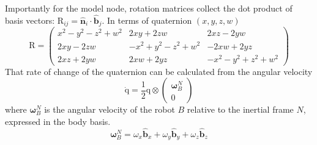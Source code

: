 \documentclass[lettersize,journal]{IEEEtran}
\begin{document}
Importantly for the model node, rotation matrices collect the dot product of basis vectors: $\mathrm{R}_{ij} = \mathbf{\hat{n}}_i \cdot \mathbf{\hat{b}}_j$. In terms of quaternion $(x, y, z, w)$
\begin{equation}
  \mathrm{R}=\left(
  \begin{smallmatrix}
    x^2-y^2-z^2+w^2 & 2xy+2zw & 2xz-2yw \\
    2xy-2zw & -x^2+y^2-z^2+w^2 & -2xw+2yz \\
    2xz+2yw & 2xw+2yz & -x^2-y^2+z^2+w^2
  \end{smallmatrix} 
  \right) \label{EQN:RotationMatrix}
\end{equation}
That rate of change of the quaternion can be calculated from the angular velocity
\begin{equation}
  \mathrm{\dot{q}} = \frac{1}{2} \mathrm{q} \otimes
  \begin{pmatrix}
    \boldsymbol\omega^N_B \\
    0
  \end{pmatrix} \label{EQN:QuaternionVelocity}
\end{equation}
where $\boldsymbol\omega^N_B$ is the angular velocity of the robot $B$ relative to the inertial frame $N$, expressed in the body basis.
\begin{equation}
  \boldsymbol\omega^N_B = \omega_x \mathbf{\hat{b}}_x + \omega_y \mathbf{\hat{b}}_y + \omega_z \mathbf{\hat{b}}_z \label{EQN:AngularVelocity}
\end{equation}
\end{document}
